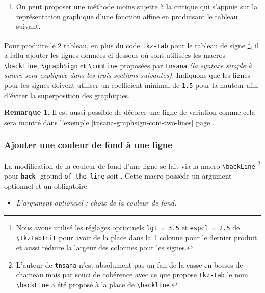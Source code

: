 \documentclass[12pt,a4paper]{book}
\makeatletter
\newcommand\env[1]{\texttt{#1}}
\newcommand\macro[1]{\env{\textbackslash{}#1}}
\theoremstyle{definition}
\newtheorem*{remark}{Remarque}
\newcommand\whyprefix[2]{%
	\textbf{\prefix{#1}}-#2%
}
\newcommand\prefix[1]{%
	\texttt{#1}%
}
\newcommand\inenglish{\@ifstar{\@inenglish@star}{\@inenglish@no@star}}
\newcommand\@inenglish@star[1]{%
	\emph{\og #1 \fg}%
}
\newcommand\@inenglish@no@star[1]{%
	\@inenglish@star{#1} en anglais%
}
\makeatother
\begin{document}
{{\begin{enumerate}
    \item On peut proposer une méthode moins sujette à la critique qui s'appuie sur la représentation graphique d'une fonction affine en produisant le tableau suivant.
\end{enumerate}

\begin{center}
	
\end{center}


Pour produire le 2\ieme{} tableau, en plus du code \verb#tkz-tab# pour le tableau de signe
\footnote{
	Nous avons utilisé les réglages optionnels
	\texttt{lgt = 3.5} et \texttt{espcl = 2.5} de \macro{tkzTabInit}
	pour avoir de la place dans la 1\iere{} colonne pour le dernier produit
	et aussi réduire la largeur des colonnes pour les signes.
},
il a fallu ajouter les lignes données ci-dessous où sont utilisées les macros     \macro{backLine}, \macro{graphSign} et \macro{comLine} proposées par \verb+tnsana+ \emph{(la syntaxe simple à suivre sera expliquée dans les trois sections suivantes)}.
	Indiquons que les lignes pour les signes doivent utiliser un coefficient minimal de \texttt{1.5} pour la hauteur afin d'éviter la superposition des graphiques.

\medskip



\begin{remark}
	Il est aussi possible de décorer une ligne de variation comme cela sera montré dans l'exemple \ref{tnsana-graphsign-com-two-lines} page \pageref{tnsana-graphsign-com-two-lines}. 
\end{remark}




\subsubsection{Ajouter une couleur de fond à une ligne}

La modification de la couleur de fond d'une ligne se fait via la macro \macro{backLine}
\footnote{
    L'auteur de \prefix{tnsana} n'est absolument pas un fan de la casse en bosses de chameau mais par souci de cohérence avec ce que propose \prefix{tkz-tab} le nom \macro{backLine} a été proposé à la place de \macro{backline}.
}
pour \whyprefix{back}{ground} \prefix{of the line} soit \inenglish{fond de la ligne}.
Cette macro possède un argument optionnel et un obligatoire.

\begin{itemize}[label=\small\textbullet, itemsep=.25em]
    \item \textit{L'argument optionnel : choix de la couleur de fond.}
          

\end{itemize}}}
\end{document}
